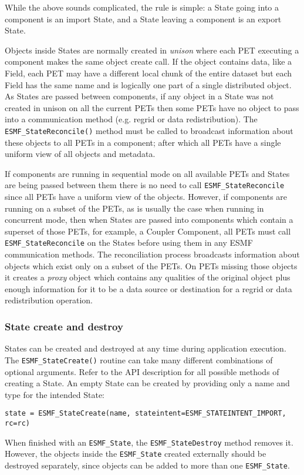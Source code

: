 While the above sounds complicated, the rule is simple:
a State going into a component is an import State, and a 
State leaving a component is an export State.

Objects inside States are normally created in {\it unison} where
each PET executing a component makes the same object create call.
If the object contains data, like a Field, each PET may have a
different local chunk of the entire dataset but each Field has
the same name and is logically one part of a single distributed 
object.   As States are passed between components, if any object
in a State was not created in unison on all the current PETs 
then some PETs have no object to pass into a
communication method (e.g. regrid or data redistribution).
The {\tt ESMF\_StateReconcile()} method must be called to broadcast 
information about these objects to all PETs in a component;
after which all PETs have a single uniform view of all objects and metadata.  

If components are running in sequential mode on all available PETs
and States are being passed between them there is no need to call 
{\tt ESMF\_StateReconcile} since all PETs have a uniform view of the objects.
However, if components are running on a subset of the PETs, as is
usually the case when running in concurrent mode, then when States
are passed into components which contain a superset of those PETs,
for example, a Coupler Component, all PETs must call {\tt ESMF\_StateReconcile}
on the States before using them in any ESMF communication methods.
The reconciliation process broadcasts information about objects
which exist only on a subset of the PETs.  On PETs missing those
objects it creates a {\it proxy} object which contains any
qualities of the original object plus enough information for it
to be a data source or destination for a regrid or data redistribution
operation.

\subsubsection{State create and destroy}

States can be created and destroyed at any time during
application execution.  The {\tt ESMF\_StateCreate()} routine
can take many different combinations of optional arguments.  Refer
to the API description for all possible methods of creating a State.
An empty State can be created by providing only a name and type for
the intended State:

{\tt state = ESMF\_StateCreate(name, stateintent=ESMF\_STATEINTENT\_IMPORT, rc=rc)}

When finished with an {\tt ESMF\_State}, the {\tt ESMF\_StateDestroy} method
removes it.  However, the objects inside the {\tt ESMF\_State}
created externally should be destroyed separately,
since objects can be added to more than one {\tt ESMF\_State}.
